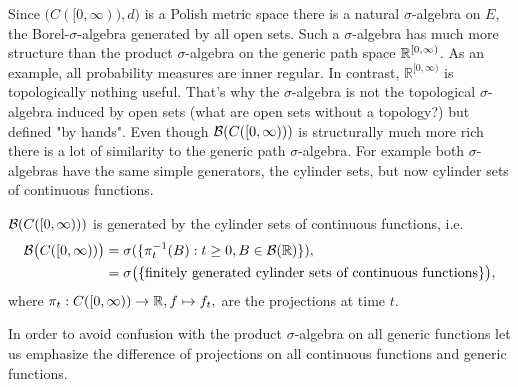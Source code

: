 Since $\big( C([0,\infty)),d \big)$ is a Polish metric space there is a natural $\sigma$-algebra on $E$, the Borel-$\sigma$-algebra generated by all open sets. Such a $\sigma$-algebra has much more structure than the product $\sigma$-algebra on the generic path space $\mathbb{R}^{[0,\infty)}$. As an example, all probability measures are inner regular. In contrast, $\mathbb{R}^{[0,\infty)}$ is topologically nothing useful. That's why the $\sigma$-algebra is not the topological $\sigma$-algebra induced by open sets (what are open sets without a topology?) but defined "by hands". Even though $\mathcal{B}(C([0,\infty)))$ is structurally much more rich there is a lot of similarity to the generic path $\sigma$-algebra. For example both $\sigma$-algebras have the same simple generators, the cylinder sets, but now cylinder sets of continuous functions.
\begin{laussagewerkzeug}
\begin{prop}
	$\mathcal{B} ( C([0,\infty)))$ is generated by the cylinder sets of continuous functions, i.e. 
	\begin{align*}
		\mathcal{B} \big( C([0,\infty))\big) &= \sigma( \{\pi_t^{-1}(B):t \geq 0, B\in  \mathcal B(\mathbb{R}) \}),\\
				&= \sigma \big( \{ \text{finitely generated cylinder sets of continuous functions} \}\big),
	\end{align*}
	where $\pi_t:C([0,\infty))\to \mathbb{R}, f\mapsto f_t,$ are the projections at time $t$.
\end{prop}
\end{laussagewerkzeug}
In order to avoid confusion with the product $\sigma$-algebra on all generic functions let us emphasize the difference of projections on all continuous functions and generic functions. 
